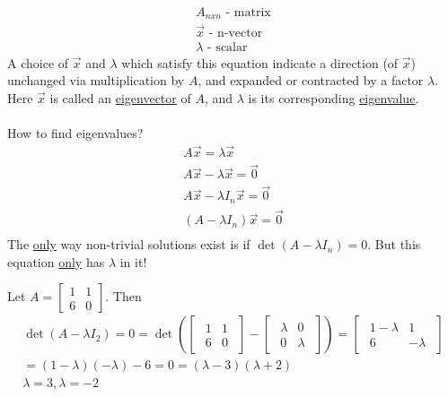 \begin{enumerate}[label=\protect\circled{\arabic*}]
\begin{equation*}
		\begin{split}
			A_{nxn} \text{ - matrix}\\
			\vec{x}\text{ - n-vector}\\
			\lambda \text{ - scalar}
		\end{split}
	\end{equation*}
	A choice of $\vec{x}$ and $\lambda$ which satisfy this equation indicate a direction (of $\vec{x}$) unchanged via multiplication by $A$, and expanded or contracted by a factor $\lambda$.\\
	Here $\vec{x}$ is called an \underline{eigenvector} of $A$, and $\lambda$ is its corresponding \underline{eigenvalue}.\\\\
	How to find eigenvalues?
	\begin{gather*}
	A\vec{x} = \lambda\vec{x}\\
	A\vec{x} - \lambda\vec{x} = \vec{0}\\
	A\vec{x} - \lambda I_n \vec{x} = \vec{0}\\
	(A - \lambda I_n)\vec{x} = \vec{0}\\	
	\end{gather*}
	The \underline{only} way non-trivial solutions exist is if $\det (A-\lambda I_n) = 0$. But this equation \underline{only} has $\lambda$ in it!
	\begin{example-N}
		Let $A = \begin{bmatrix}
			1 & 1\\ 6 & 0
		\end{bmatrix}$. Then\\
		\begin{gather*}
			\det (A - \lambda I_2) = 0 = \det (
			\begin{bmatrix}
				\begin{smallmatrix}
					1 & 1\\ 6 & 0
				\end{smallmatrix}
			\end{bmatrix} - 
			\begin{bmatrix}
				\begin{smallmatrix}
					\lambda & 0\\ 0 & \lambda
				\end{smallmatrix}
			\end{bmatrix}) = 
			\begin{bmatrix}
				\begin{smallmatrix}
					1 - \lambda & 1\\ 6 & -\lambda
				\end{smallmatrix}
			\end{bmatrix}\\
			= (1 - \lambda)(-\lambda) - 6 = 0 = (\lambda - 3)(\lambda + 2)\\
			\boxed{\lambda = 3, \lambda = -2}
		\end{gather*}
	\end{example-N}
\end{enumerate}